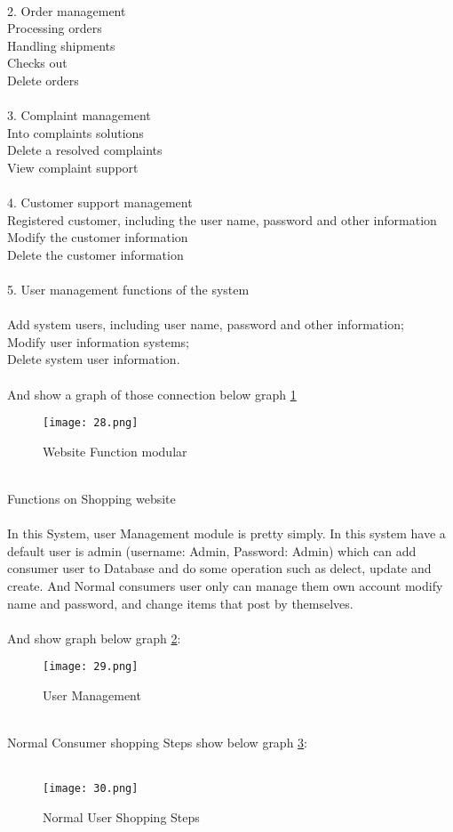   \\
2. Order management\\
  Processing orders\\
  Handling shipments\\
  Checks out\\
  Delete orders\\ 
\\
3. Complaint management\\
  Into complaints solutions\\
  Delete a resolved complaints\\
  View complaint support\\
  \\
4. Customer support management\\
  Registered customer, including the user name, password and other information\\
  Modify the customer information\\
  Delete the customer information\\
  \\
5. User management functions of the system\\
\\
  Add system users, including user name, password and other information;\\
  Modify user information systems;\\
  Delete system user information.\\
\\
And show a graph of those connection below graph \ref{fig:3 cubed graph}\\
\begin{figure}[h]
	\centering
	\texttt{[image: 28.png]}
	\caption{Website Function modular}
	\label{fig:3 cubed graph}
\end{figure}
\\
Functions on Shopping website\\
 \\
	In this System, user Management module is pretty simply. In this system have a default user is admin (username: Admin, Password: Admin) which can add consumer user to Database and do some operation such as delect, update and create. And Normal consumers user only can manage them own account modify name and password, and change items that post by themselves.\\
	\\
And show graph below graph \ref{fig:4 cubed graph}:
\\
\begin{figure}[h]
	\centering
	\texttt{[image: 29.png]}
	\caption{User Management}
	\label{fig:4 cubed graph}
\end{figure}
\\
Normal Consumer shopping Steps show below graph \ref{fig:5 cubed graph}:\\
\\
\begin{figure}[h]
	\centering
	\texttt{[image: 30.png]}
	\caption{Normal User Shopping Steps}
	\label{fig:5 cubed graph}
\end{figure}
  \\
